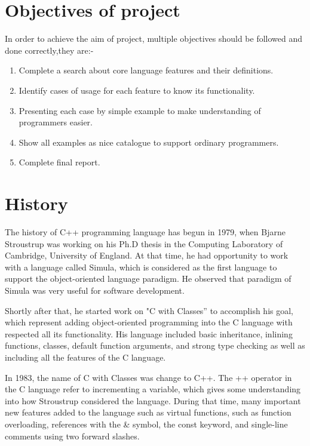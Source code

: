\documentclass[12pt]{report}
\begin{document}
\section{Objectives of project}
\label{section:objectives of project}
In order to achieve the aim of project, multiple objectives should be followed and done correctly,they are:-
 \begin{enumerate}
   \item Complete a search about core language features and their definitions.
   \item Identify cases of usage for each feature  to know its functionality.
   \item Presenting each case by simple example to make understanding of \linebreak programmers easier.
   \item Show all examples as nice catalogue to support ordinary \linebreak programmers.
   \item Complete final report.
 \end{enumerate}       
 
  
\section{History}
\label{section: History}
The history of C++ programming language has begun in 1979, when Bjarne Stroustrup was working on his Ph.D thesis in the Computing Laboratory of Cambridge, University of England. At that time, he had opportunity to work with a language called Simula, which is considered as the first language to support the object-oriented language paradigm. He observed that paradigm of Simula was very useful for software development\cite{StroustrupHistory}.

Shortly after that, he started work on "C with Classes” to accomplish his goal, which represent adding object-oriented programming into the C language with respected all its functionality. His language included basic inheritance, inlining functions, classes, default function arguments, and strong type checking as well as including all the features of the C language\cite{StroustrupHistory}.

In 1983, the name of C with Classes was change to C++. The ++ operator in the C language refer to incrementing a variable, which gives some understanding into how Stroustrup considered the language. During that time, many important new features added to the language such as  virtual functions, such as function overloading, references with the \& symbol, the const keyword, and single-line comments using two forward slashes\cite{StroustrupHistory}.
\end{document}
